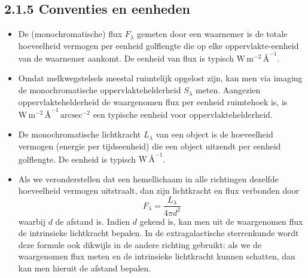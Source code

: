 \documentclass[10pt,a4paper]{article}
\renewenvironment{equation}{\begin{equation*}}{\end{equation*}}
\begin{document}
\subsection*{2.1.5 Conventies en eenheden}
\begin{itemize}
  \item De (monochromatische) flux $F_\lambda$ gemeten door een waarnemer is de totale hoeveelheid vermogen per eenheid golflengte die op elke oppervlakte-eenheid van de waarnemer aankomt. De eenheid van flux is typisch $\mathrm{W\,m^{-2}\,\text{\AA}^{-1}}$. 
  \item Omdat melkwegstelsels meestal ruimtelijk opgelost zijn, kan men via imaging de monochromatische oppervlaktehelderheid $S_\lambda$ meten. Aangezien oppervlaktehelderheid de waargenomen flux per eenheid ruimtehoek is, is $\mathrm{W\,m^{-2}\,\text{\AA}^{-1}\,arcsec^{-2}}$ een typische eenheid voor oppervlaktehelderheid.
  \item De monochromatische lichtkracht $L_\lambda$ van een object is de hoeveelheid vermogen (energie per tijdseenheid) die een object uitzendt per eenheid golflengte. De eenheid is typisch $\mathrm{W\,\text{\AA}^{-1}}$.
  \item Als we veronderstellen dat een hemellichaam in alle richtingen dezelfde hoeveelheid vermogen uitstraalt, dan zijn lichtkracht en flux verbonden door
  \begin{equation}
    F_\lambda = \frac{L_\lambda}{4\pi d^2}
    \tag{2.2}
  \end{equation}
  waarbij $d$ de afstand is. Indien $d$ gekend is, kan men uit de waargenomen flux de intrinsieke lichtkracht bepalen. In de extragalactische sterrenkunde wordt deze formule ook dikwijls in de andere richting gebruikt: als we de waargenomen flux meten en de intrinsieke lichtkracht kunnen schatten, dan kan men hieruit de afstand bepalen.


\end{itemize}
\end{document}
